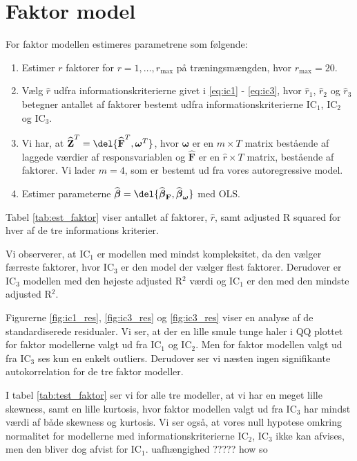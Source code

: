 \clearpage
\section{Faktor model}
For faktor modellen estimeres parametrene som følgende:
\begin{enumerate}
\item Estimer $r$ faktorer for $r = 1, \dots, r_{\max}$ på træningsmængden, hvor $r_{\max} = 20$.  
\item Vælg $\widehat{r}$ udfra informationskriterierne givet i \eqref{eq:ic1} -  \eqref{eq:ic3}, hvor $\widehat{r}_1$, $\widehat{r}_2$ og $\widehat{r}_3$ betegner antallet af faktorer bestemt udfra informationskriterierne IC$_1$, IC$_2$ og IC$_3$.
\item Vi har, at $\widehat{\textbf{Z}}^T = \del{\widehat{{\textbf{F}}}^T, \boldsymbol{\omega}^T}$, hvor $ \boldsymbol{\omega}$ er en $m \times T $ matrix bestående af laggede værdier af responsvariablen og $\widehat{\textbf{F}}$ er en $\widehat{r} \times T$ matrix, bestående af faktorer. Vi lader $m = 4$, som er bestemt ud fra vores autoregressive model. 
\item Estimer parameterne $\widehat{\boldsymbol{\beta}} = \del{ \widehat{\boldsymbol{\beta}}_{\textbf{F}}, \widehat{\boldsymbol{\beta}}_{\boldsymbol{\omega}}}$ med OLS.
\end{enumerate}

Tabel \ref{tab:est_faktor} viser antallet af faktorer, $\widehat{r}$, samt adjusted R squared for hver af de tre informations kriterier. 


Vi observerer, at IC$_1$ er modellen med mindst kompleksitet, da den vælger færreste faktorer, hvor IC$_3$ er den model der vælger flest faktorer. Derudover er IC$_3$ modellen med den højeste adjusted R$^2$ værdi og IC$_1$ er den med den mindste adjusted R$^2$.

Figurerne \ref{fig:ic1_res}, \ref{fig:ic3_res} og \ref{fig:ic3_res} viser en analyse af de standardiserede residualer. Vi ser, at der en lille smule tunge haler i QQ plottet for faktor modellerne valgt ud fra IC$_1$ og IC$_2$. Men for faktor modellen valgt ud fra IC$_3$ ses kun en enkelt outliers. 
Derudover ser vi næsten ingen signifikante autokorrelation for de tre faktor modeller. 



I tabel  \ref{tab:test_faktor} ser vi for alle tre modeller, at vi har en meget lille skewness, samt en lille kurtosis, hvor faktor modellen valgt ud fra IC$_3$ har mindst værdi af både skewness og kurtosis. 
Vi ser også, at vores null hypotese omkring normalitet for modellerne med informationskriterierne IC$_2$, IC$_3$ ikke kan afvises, men den bliver dog afvist for IC$_1$. uafhængighed ????? how so 
 

